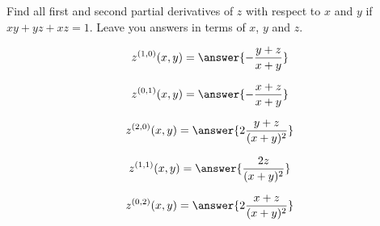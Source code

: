 \documentclass{ximera}
\author{David Guichard \and Neal Koblitz \and H. Jerome Keisler \and Albert Scheller \and Barry Balof \and Mike Wills \and Matthew Carr}
\begin{document}
\begin{exercise}




Find all first and second partial derivatives of $z$ with respect to $x$ and $y$ if $xy+yz+xz=1$. Leave you answers in terms of $x$, $y$ and $z$.
\begin{prompt}
\[
z^{(1,0)}(x,y)=\answer{-\frac{y+z}{x+y}}
\]
\end{prompt}
\begin{prompt}
\[
z^{(0,1)}(x,y)=\answer{-\frac{x+z}{x+y}}
\]
\end{prompt}
\begin{prompt}
\[
z^{(2,0)}(x,y)=\answer{2\frac{y+z}{(x+y)^2}}
\]
\end{prompt}
\begin{prompt}
\[
z^{(1,1)}(x,y)=\answer{\frac{2z}{(x+y)^2}}
\]
\end{prompt}
\begin{prompt}
\[
z^{(0,2)}(x,y)=\answer{2\frac{x+z}{(x+y)^2}}
\]
\end{prompt}

\end{exercise}
\end{document}
